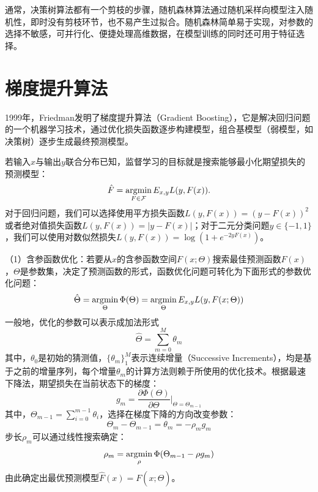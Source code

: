 通常，决策树算法都有一个剪枝的步骤，随机森林算法通过随机采样向模型注入随机性，即时没有剪枝环节，也不易产生过拟合。随机森林简单易于实现，对参数的选择不敏感，可并行化、便捷处理高维数据，在模型训练的同时还可用于特征选择。

\section{梯度提升算法}
1999年，Friedman\cite{friedman2001greedy,friedman2002stochastic}发明了梯度提升算法（Gradient Boosting），它是解决回归问题的一个机器学习技术，通过优化损失函数逐步构建模型，组合基模型（弱模型，如决策树）逐步生成最终预测模型。

若输入$x$与输出$y$联合分布已知，监督学习的目标就是搜索能够最小化期望损失的预测模型：
\begin{equation}
    \hat F = \operatorname*{\mathrm{\arg\!\min}}\limits_{F\in \mathcal F} E_{x,y} L(y,F(x)).
\end{equation}
对于回归问题，我们可以选择使用平方损失函数$L(y,F(x)) = (y-F(x))^2$或者绝对值损失函数$L(y,F(x)) = |y-F(x)|$；对于二元分类问题$y\in\{-1,1\}$，我们可以使用对数似然损失$L(y,F(x)) = \log(1+e^{-2yF(x)})$。

（1）含参函数优化：若要从$x$的含参函数空间$F(x;\Theta)$搜索最佳预测函数$F(x)$，$\Theta$是参数集，决定了预测函数的形式，函数优化问题可转化为下面形式的参数优化问题：
\begin{equation}
    \hat\Theta = \operatorname*{\mathrm{\arg\!\min}}\limits_{\Theta} \Phi(\Theta) = \operatorname*{\mathrm{\arg\!\min}}\limits_{\Theta} E_{x,y} L(y,F(x;\Theta))
\end{equation}
一般地，优化的参数可以表示成加法形式
\begin{equation}
    \hat\Theta = \sum\limits_{m=0}^M \theta_m
\end{equation}
其中，$\theta_0$是初始的猜测值，$\{\theta_m\}_1^M$表示连续增量（Successive Increments），均是基于之前的增量序列，每个增量$\theta_m$的计算方法则赖于所使用的优化技术。根据最速下降法，期望损失在当前状态下的梯度：
\begin{equation}
    g_m = \frac{\partial \Phi(\Theta)}{\partial \Theta}\Big |_{\Theta = \Theta_{m-1}}
\end{equation}
其中，$\Theta_{m-1} = \sum\limits_{i=0}^{m-1} \theta_i$，选择在梯度下降的方向改变参数：
\begin{equation}
    \Theta_m - \Theta_{m-1} = \theta_m = -\rho_m g_m
\end{equation}
步长$\rho_m$可以通过线性搜索确定：
\begin{equation}
    \rho_m = \operatorname*{\mathrm{\arg\!\min}}_{\rho} \Phi(\Theta_{m-1} - \rho g_m)
\end{equation}
由此确定出最优预测模型$\hat F(x)=F(x;\hat\Theta)$。

